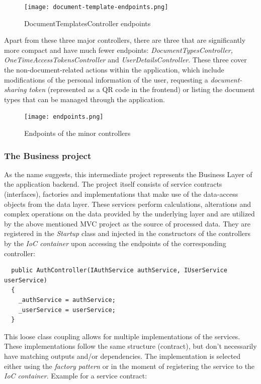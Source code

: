 \begin{figure}[H]
	\centering
	\texttt{[image: document-template-endpoints.png]}
	\caption{DocumentTemplatesController endpoints}
\end{figure}

Apart from these three major controllers, there are three that are significantly more compact and have much fewer endpoints:
\emph{DocumentTypesController, OneTimeAccessTokensController} and \emph{UserDetailsController}.
These three cover the non-document-related actions within the application, which include modifications of the personal information of the user, 
requesting a \emph{document-sharing token} (represented as a QR code in the frontend) or listing the document types that can be managed through the application.

\begin{figure}[H]
	\centering
	\texttt{[image: endpoints.png]}
	\caption{Endpoints of the minor controllers}
\end{figure}

\subsubsection{The Business project}

As the name suggests, this intermediate project represents the Business Layer of the application backend.
The project itself consists of service contracts (interfaces), factories and implementations that make use of the data-access objects from the 
data layer.
These services perform calculations, alterations and complex operations on the data provided by the underlying layer and are utilized by the 
above mentioned MVC project as the source of processed data.
They are registered in the \emph{Startup} class and injected in the constructors of the controllers by the \emph{IoC container} upon 
accessing the endpoints of the corresponding controller:

\begin{lstlisting}
  public AuthController(IAuthService authService, IUserService userService)
  {
	_authService = authService;
	_userService = userService;
  }
\end{lstlisting}

This loose class coupling allows for multiple implementations of the services.
These implementations follow the same structure (contract), but don't necessarily have matching outputs and/or dependencies.
The implementation is selected either using the \emph{factory pattern} or in the moment of registering the service to the \emph{IoC container}.
Example for a service contract:


